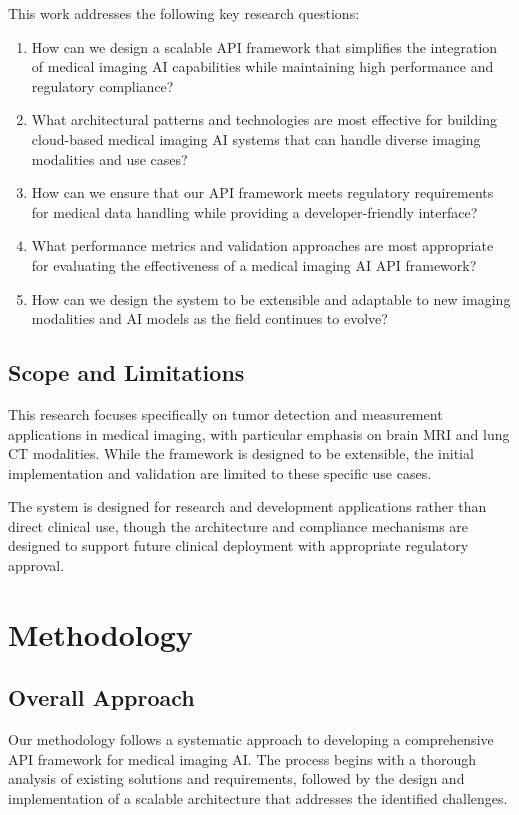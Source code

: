 \documentclass[12pt,a4paper]{article}
\begin{document}
This work addresses the following key research questions:

\begin{enumerate}
    \item How can we design a scalable API framework that simplifies the integration of medical imaging AI capabilities while maintaining high performance and regulatory compliance?
    \item What architectural patterns and technologies are most effective for building cloud-based medical imaging AI systems that can handle diverse imaging modalities and use cases?
    \item How can we ensure that our API framework meets regulatory requirements for medical data handling while providing a developer-friendly interface?
    \item What performance metrics and validation approaches are most appropriate for evaluating the effectiveness of a medical imaging AI API framework?
    \item How can we design the system to be extensible and adaptable to new imaging modalities and AI models as the field continues to evolve?
\end{enumerate}

\subsection{Scope and Limitations}

This research focuses specifically on tumor detection and measurement applications in medical imaging, with particular emphasis on brain MRI and lung CT modalities. While the framework is designed to be extensible, the initial implementation and validation are limited to these specific use cases.

The system is designed for research and development applications rather than direct clinical use, though the architecture and compliance mechanisms are designed to support future clinical deployment with appropriate regulatory approval.

\section{Methodology}

\subsection{Overall Approach}

Our methodology follows a systematic approach to developing a comprehensive API framework for medical imaging AI. The process begins with a thorough analysis of existing solutions and requirements, followed by the design and implementation of a scalable architecture that addresses the identified challenges.
\end{document}
